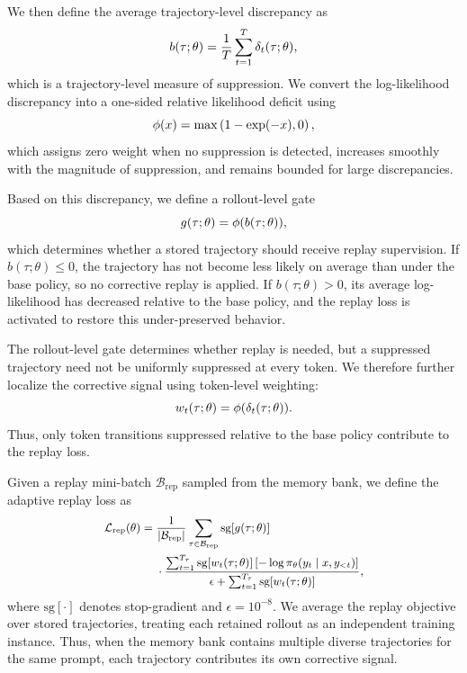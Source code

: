 \documentclass[11pt]{article}
\begin{document}
We then define the average trajectory-level discrepancy as
\begin{equation}\small
    b(\tau;\theta)
    =
    \frac{1}{T}
    \sum_{t=1}^{T}
    \delta_t(\tau;\theta),
\end{equation}
which is a trajectory-level measure of suppression. We convert the log-likelihood discrepancy into a one-sided relative likelihood deficit using
\begin{equation}\small
\phi(x)=\max\left(1-\exp(-x),0\right),
\end{equation}
which assigns zero weight when no suppression is detected, increases smoothly with the magnitude of suppression, and remains bounded for large discrepancies.

Based on this discrepancy, we define a rollout-level gate
\begin{equation}\small
    g(\tau;\theta)=\phi(b(\tau;\theta)),
\end{equation}
which determines whether a stored trajectory should receive replay supervision. If $b(\tau;\theta)\leq 0$, the trajectory has not become less likely on average than under the base policy, so no corrective replay is applied. If $b(\tau;\theta)>0$, its average log-likelihood has decreased relative to the base policy, and the replay loss is activated to restore this under-preserved behavior.

The rollout-level gate determines whether replay is needed, but a suppressed trajectory need not be uniformly suppressed at every token. We therefore further localize the corrective signal using token-level weighting:
\begin{equation}\small
w_t(\tau;\theta)=\phi(\delta_t(\tau;\theta)).
\end{equation}
Thus, only token transitions suppressed relative to the base policy contribute to the replay loss.

Given a replay mini-batch $\mathcal{B}_{\mathrm{rep}}$ sampled from the memory bank, we define the adaptive replay loss as
\begin{equation}\small
\begin{split}
\mathcal{L}_{\mathrm{rep}}(\theta) = {} & \frac{1}{|\mathcal{B}_{\mathrm{rep}}|}
\sum_{\tau\in\mathcal{B}_{\mathrm{rep}}} \mathrm{sg}[g(\tau;\theta)] \\
& \cdot\frac{\sum_{t=1}^{T_\tau}\mathrm{sg}[w_t(\tau;\theta)]\left[-\log \pi_\theta(y_t \mid x,y_{<t})\right]}
{\epsilon+\sum_{t=1}^{T_\tau}\mathrm{sg}[w_t(\tau;\theta)]},
\end{split}
\end{equation}
where $\mathrm{sg}[\cdot]$ denotes stop-gradient and $\epsilon=10^{-8}$.
We average the replay objective over stored trajectories, treating each retained rollout as an independent training instance. Thus, when the memory bank contains multiple diverse trajectories for the same prompt, each trajectory contributes its own corrective signal.
\end{document}
